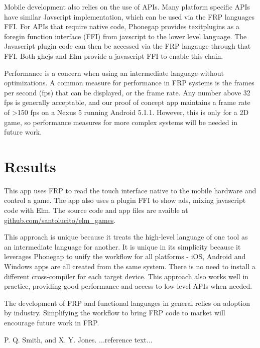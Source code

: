\documentclass[preprint]{sigplanconf}
\begin{document}
Mobile development also relies on the use of APIs.
Many platform specific APIs have similar Javscript implementation, which can be used via the FRP languages FFI.
For APIs that require native code, Phonegap provides texit{plugins} as a foregin function interface (FFI) from javscript to the lower level language.
The Javascript plugin code can then be accessed via the FRP langauge through that FFI.
Both ghcjs and Elm provide a javascript FFI to enable this chain. 

Performance is a concern when using an intermediate language without optimizations. 
A common measure for performance in FRP systems is the frames per second (fps) that can be displayed, or the frame rate.
Any number above 32 fps is generally acceptable, and our proof of concept app maintains a frame rate of >150 fps on a Nexus 5 running Android 5.1.1.
However, this is only for a 2D game, so performance measures for more complex systems will be needed in future work.

\section{Results}
This app uses FRP to read the touch interface native to the mobile hardware and control a game.
The app also uses a plugin FFI to show ads, mixing javascript code with Elm.
The source code and app files are avaible at \url{github.com/santolucito/elm_games}.

This approach is unique because it treats the high-level language of one tool as an intermediate language for another. 
It is unique in its simplicity because it leverages Phonegap to unify the workflow for all platforms - iOS, Android and Windows apps are all created from the same system.
There is no need to install a different cross-compiler for each target device.
This approach also works well in practice, providing good performance and access to low-level APIs when needed.

 
The development of FRP and functional languages in general relies on adoption by industry.
Simplifying the workflow to bring FRP code to market will encourage future work in FRP.





\begin{thebibliography}{}
\softraggedright

P. Q. Smith, and X. Y. Jones. ...reference text...

\end{thebibliography}
\end{document}
